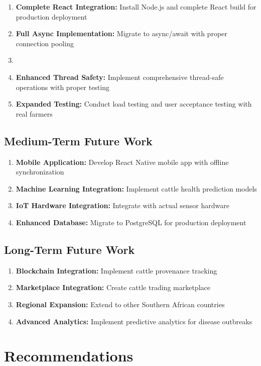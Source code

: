 \begin{enumerate}
    \item \textbf{Complete React Integration:} Install Node.js and complete React build for production deployment
    \item \textbf{Full Async Implementation:} Migrate to async/await with proper connection pooling
    \item \item \textbf{Enhanced Thread Safety:} Implement comprehensive thread-safe operations with proper testing
    \item \textbf{Expanded Testing:} Conduct load testing and user acceptance testing with real farmers
\end{enumerate}

\subsection{Medium-Term Future Work}

\begin{enumerate}
    \item \textbf{Mobile Application:} Develop React Native mobile app with offline synchronization
    \item \textbf{Machine Learning Integration:} Implement cattle health prediction models
    \item \textbf{IoT Hardware Integration:} Integrate with actual sensor hardware
    \item \textbf{Enhanced Database:} Migrate to PostgreSQL for production deployment
\end{enumerate}

\subsection{Long-Term Future Work}

\begin{enumerate}
    \item \textbf{Blockchain Integration:} Implement cattle provenance tracking
    \item \textbf{Marketplace Integration:} Create cattle trading marketplace
    \item \textbf{Regional Expansion:} Extend to other Southern African countries
    \item \textbf{Advanced Analytics:} Implement predictive analytics for disease outbreaks
\end{enumerate}

\section{Recommendations}

